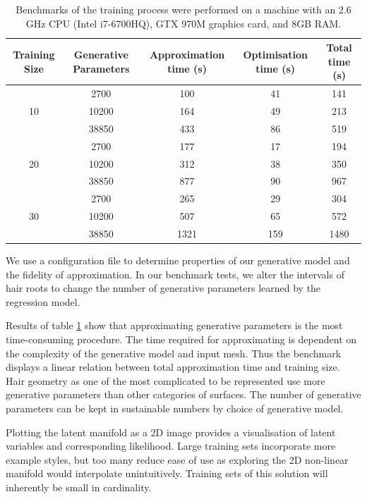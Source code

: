 \documentclass[ %
author={Dillon Keith Diep},
supervisor={Dr. Carl Henrik Ek},
degree={MEng},
title={ART-CG:},
subtitle={Assisted Real-time Content Generation of 3D Hair by Learning Manifolds},
type={Research},
year={2017} ]{dissertation}
\begin{document}
\begin{table}[!h]
	\centering
	\begin{tabular}{|c|c|c|c|c|}
		\hline
		Training Size & Generative Parameters &	Approximation time (s)	& Optimisation time (s)	&	Total time (s)\\
		\hline
		\multirow{3}{*}{10}
		& 2700 	& 100	    & 41     	& 141\\
		& 10200 & 164	    & 49		& 213\\
		& 38850 & 433      	& 86      	& 519\\
		\hline
		\multirow{3}{*}{20}
		& 2700 	& 177      	& 17        & 194\\
		& 10200 & 312      	& 38      	& 350\\
		& 38850 & 877		& 90	    & 967\\
		\hline
		\multirow{3}{*}{30}
		& 2700 	& 265      	& 29      	& 304\\
		& 10200 & 507      	& 65      	& 572\\
		& 38850 & 1321      & 159      	& 1480\\
		\hline
	\end{tabular}
	\caption{Benchmarks of the training process were performed on a machine with an 2.6 GHz CPU (Intel i7-6700HQ), GTX 970M graphics card, and 8GB RAM. }
	\label{trainingbenchmarks}
\end{table}

We use a configuration file to determine properties of our generative model and the fidelity of approximation. In our benchmark tests, we alter the intervals of hair roots to change the number of generative parameters learned by the regression model.

Results of table \ref{trainingbenchmarks} show that approximating generative parameters is the most time-consuming procedure. The time required for approximating is dependent on the complexity of the generative model and input mesh. Thus the benchmark displays a linear relation between total approximation time and training size. Hair geometry as one of the most complicated to be represented use more generative parameters than other categories of surfaces. The number of generative parameters can be kept in sustainable numbers by choice of generative model.

Plotting the latent manifold as a 2D image provides a visualisation of latent variables and corresponding likelihood. Large training sets incorporate more example styles, but too many reduce ease of use as exploring the 2D non-linear manifold would interpolate unintuitively. Training sets of this solution will inherently be small in cardinality.
\end{document}
